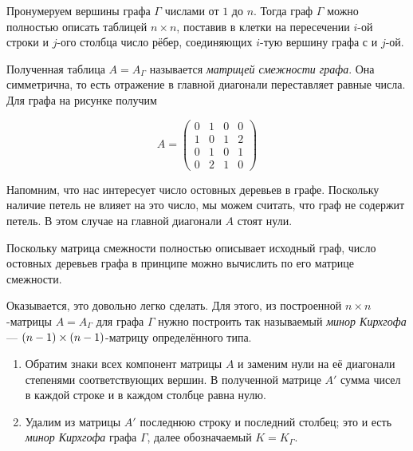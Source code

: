 \documentclass{article}
\begin{document}
{

\begin{wrapfigure}[4]{r}{28 mm}
\vskip -5mm
\end{wrapfigure}

Пронумеруем вершины графа $\Gamma$ числами от $1$ до $n$.
Тогда граф $\Gamma$ можно полностью описать таблицей $n\times n$, поставив в клетки на пересечении $i$-ой строки и $j$-ого столбца число рёбер, соединяющих $i$-тую вершину графа с и $j$-ой.

}

Полученная таблица $A=A_\Gamma$ называется \emph{матрицей смежности графа}.
Она симметрична, то есть отражение в главной диагонали переставляет равные числа.
Для графа на рисунке получим 

\[A=\left(
\begin{matrix}
0&1&0&0
\\
1&0&1&2
\\
0&1&0&1
\\
0&2&1&0
\end{matrix}
\right)\]

Напомним, что нас интересует число остовных деревьев в графе.
Поскольку наличие петель не влияет на это число, мы можем считать, что граф не содержит петель.
В этом случае на главной диагонали $A$ стоят нули.

Поскольку матрица смежности полностью описывает исходный граф, 
число остовных деревьев графа в принципе можно вычислить по его матрице смежности.

Оказывается, это довольно легко сделать.
Для этого, из построенной $n\times n$-матрицы  $A=A_\Gamma$ для графа $\Gamma$ нужно построить так называемый \emph{минор Кирхгофа} --- $(n-1)\z\times(n-1)$-матрицу определённого типа. 

\begin{enumerate}
\item Обратим знаки всех компонент матрицы $A$ и заменим нули на её диагонали степенями соответствующих вершин. 
В полученной матрице $A'$ сумма чисел в каждой строке и в каждом столбце равна нулю. 
\item Удалим из матрицы $A'$ последнюю строку и последний столбец;
это и есть \emph{минор Кирхгофа} графа $\Gamma$, далее 
обозначаемый $K=K_\Gamma$.
\end{enumerate}
\end{document}
